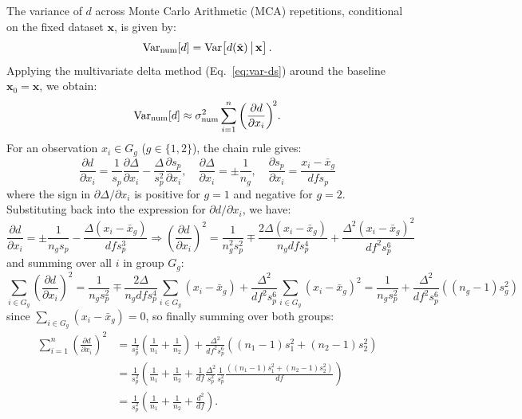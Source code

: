The variance of $d$ across Monte Carlo Arithmetic (MCA) repetitions,
conditional on the fixed dataset $\mathbf{x}$, is given by:
\begin{equation*}
    \mathrm{Var}_{\mathrm{num}}[d]
    = \mathrm{Var}\!\left[d(\tilde{\mathbf{x}})\,\big|\,\mathbf{x}\right].
    \label{eq:var-rep-def}
\end{equation*}
Applying the multivariate delta method (Eq.~\ref{eq:var-ds}) around the baseline
$\mathbf{x}_0 = \mathbf{x}$, we obtain:
\begin{equation}
    \mathrm{Var}_{\mathrm{num}}[d]
    \approx
    \sigma_{\mathrm{num}}^2
    \sum_{i=1}^{n}
    {\left(\frac{\partial d}{\partial x_i}\right)}^{\!2}.
    \label{eq:var-rep-approx}
\end{equation}
For an observation $x_i \in G_g$ ($g \in \{1,2\}$), the chain rule gives:
\begin{equation*}
    \frac{\partial d}{\partial x_i} = \frac{1}{s_p}\frac{\partial \Delta}{\partial x_i} - \frac{\Delta}{s_p^2}\frac{\partial s_p}{\partial x_i}, \quad
    \frac{\partial \Delta}{\partial x_i} = \pm \frac{1}{n_g}, \quad
    \frac{\partial s_p}{\partial x_i} = \frac{x_i - \bar{x}_g}{df s_p}
    \label{eq:d-deriv-chain}
\end{equation*}
where the sign in $\partial \Delta/\partial x_i$ is positive for $g=1$ and
negative for $g=2$. Substituting back into the expression for $\partial
    d/\partial x_i$, we have:
\begin{equation*}
    \frac{\partial d}{\partial x_i} = \pm\frac{1}{n_g s_p} - \frac{\Delta(x_i - \bar{x}_g)}{df s_p^3}
    \Rightarrow {\left(\frac{\partial d}{\partial x_i}\right)}^2 = \frac{1}{n_g^2 s_p^2} \mp \frac{2\Delta(x_i - \bar{x}_g)}{n_g df s_p^4} + \frac{\Delta^2{(x_i - \bar{x}_g)}^2}{df^2 s_p^6}
\end{equation*}
and summing over all $i$ in group $G_g$:
\begin{equation*}
    \sum_{i\in G_g}{\left(\frac{\partial d}{\partial x_i}\right)}^2 =
    \frac{1}{n_g s_p^2} \mp \frac{2\Delta}{n_g df s_p^4}\sum_{i\in G_g}(x_i - \bar{x}_g) + \frac{\Delta^2}{df^2 s_p^6}\sum_{i\in G_g}{(x_i - \bar{x}_g)}^2 = \frac{1}{n_g s_p^2} + \frac{\Delta^2}{df^2 s_p^6}\left((n_g - 1)s_g^2 \right)
\end{equation*}
since $\sum_{i\in G_g}(x_i - \bar{x}_g) = 0$, so finally summing over both
groups:
\begin{align*}
    \sum_{i = 1}^{n}{\left(\frac{\partial d}{\partial x_i}\right)}^2
     & = \frac{1}{s_p^2}\left(\frac{1}{n_1} + \frac{1}{n_2}\right) +
    \frac{\Delta^2}{df^2 s_p^6}\left((n_1 - 1)s_1^2 + (n_2 - 1)s_2^2 \right)                                         \\
     & = \frac{1}{s_p^2}\left(\frac{1}{n_1} + \frac{1}{n_2} +
    \frac{1}{df}\frac{\Delta^2}{s_p^2}\frac{1}{s_p^2}\frac{\left((n_1 - 1)s_1^2 + (n_2 - 1)s_2^2 \right)}{df}\right) \\
     & = \frac{1}{s_p^2}\left(\frac{1}{n_1} + \frac{1}{n_2} + \frac{d^2}{df} \right).
\end{align*}
